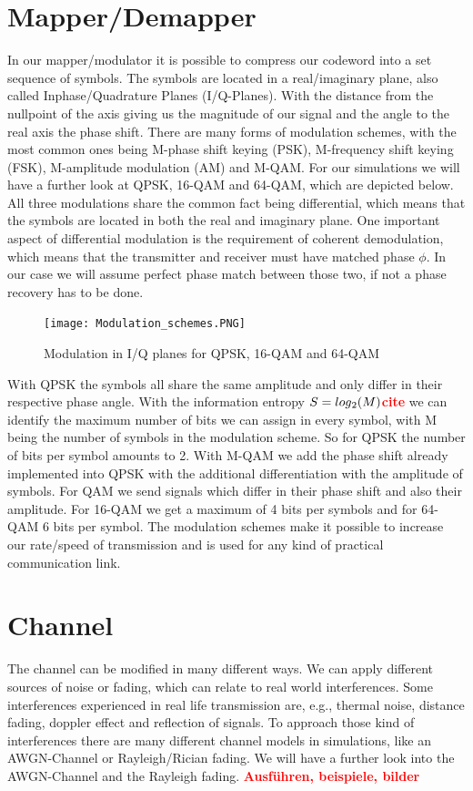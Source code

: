 \documentclass[12pt,oneside, reqno]{report}
\newcommand\boldred[1]{\textcolor{red}{\textbf{#1}}}
\begin{document}
\section{Mapper/Demapper}
\label{sec:mod}
In our mapper/modulator it is possible to compress our codeword into a set sequence of symbols. The symbols are located in a real/imaginary plane, also called Inphase/Quadrature Planes (I/Q-Planes). With the distance from the nullpoint of the axis giving us the magnitude of our signal and the angle to the real axis the phase shift. 
There are many forms of modulation schemes, with the most common ones being M-phase shift keying (PSK), M-frequency shift keying (FSK), M-amplitude modulation (AM) and M-\gls{QAM}. For our simulations we will have a further look at \gls{QPSK}, 16-\gls{QAM} and 64-\gls{QAM}, which are depicted below. All three modulations share the common fact being differential, which means that the symbols are located in both the real and imaginary plane. One important aspect of differential modulation is the requirement of coherent demodulation, which means that the transmitter and receiver must have matched phase $\phi$. In our case we will assume perfect phase match between those two, if not a phase recovery has to be done.  

\begin{figure}[H]
	\centering
	\texttt{[image: Modulation\_schemes.PNG]}
	\caption{Modulation in I/Q planes for QPSK, 16-QAM and 64-QAM}
	\label{fig:Modulation}
\end{figure}

With \gls{QPSK} the symbols all share the same amplitude and only differ in their respective phase angle. With the information entropy $S = log\textsubscript{2}(M)$\boldred{cite} we can identify the maximum number of bits we can assign in every symbol, with M being the number of symbols in the modulation scheme. So for \gls{QPSK} the number of bits per symbol amounts to 2.
\newline
With M-\gls{QAM} we add the phase shift already implemented into \gls{QPSK} with the additional differentiation with the amplitude of symbols. For \gls{QAM} we send signals which differ in their phase shift and also their amplitude.  For 16-\gls{QAM} we get a maximum of 4 bits per symbols and for 64-\gls{QAM} 6 bits per symbol.
The modulation schemes make it possible to increase our rate/speed of transmission and is used for any kind of practical communication link.

\section{Channel}
\label{sec:channel}
The channel can be modified in many different ways. We can apply different sources of noise or fading, which can relate to real world interferences. Some interferences experienced in real life transmission are, e.g., thermal noise, distance fading, doppler effect and reflection of signals. To approach those kind of interferences there are many different channel models in simulations, like an \gls{AWGN}-Channel or Rayleigh/Rician fading. We will have a further look into the \gls{AWGN}-Channel and the Rayleigh fading.
\newline
\boldred{Ausführen, beispiele, bilder}
\end{document}
